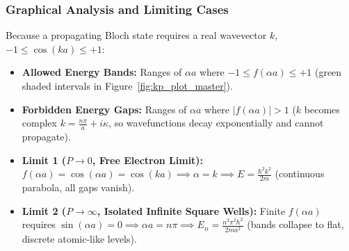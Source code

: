 \documentclass[11pt,a4paper]{article}
\newcommand{\abs}[1]{\left|#1\right|}
\newcommand{\hb}{\hbar}
\newcommand{\hbarsq}{\hb^2}
\begin{document}
\subsubsection{Graphical Analysis and Limiting Cases}
Because a propagating Bloch state requires a real wavevector $k$, $-1 \le \cos(ka) \le +1$:
\begin{itemize}
    \item \textbf{Allowed Energy Bands:} Ranges of $\alpha a$ where $-1 \le f(\alpha a) \le +1$ (green shaded intervals in Figure~\ref{fig:kp_plot_master}).
    \item \textbf{Forbidden Energy Gaps:} Ranges of $\alpha a$ where $\abs{f(\alpha a)} > 1$ ($k$ becomes complex $k = \frac{n\pi}{a} + i\kappa$, so wavefunctions decay exponentially and cannot propagate).
    \item \textbf{Limit 1 ($P \to 0$, Free Electron Limit):} $f(\alpha a) = \cos(\alpha a) = \cos(ka) \implies \alpha = k \implies E = \frac{\hbarsq k^2}{2m}$ (continuous parabola, all gaps vanish).
    \item \textbf{Limit 2 ($P \to \infty$, Isolated Infinite Square Wells):} Finite $f(\alpha a)$ requires $\sin(\alpha a) = 0 \implies \alpha a = n\pi \implies E_n = \frac{n^2\pi^2\hbarsq}{2ma^2}$ (bands collapse to flat, discrete atomic-like levels).
\end{itemize}
\end{document}
